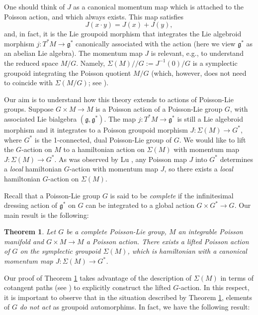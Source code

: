 \documentclass[a4paper,11pt]{amsart}
\newtheorem{thmz}{Theorem}
\theoremstyle{definition}
\theoremstyle{remark}
\begin{document}
One should think of $J$ as a canonical momentum map which is
attached to the Poisson action, and which always exists. This map satisfies
\[ J(x\cdot y)=J(x)+J(y),\]
and, in fact, it is the Lie groupoid morphism that integrates the
Lie algebroid morphism $j:T^*M\to{\mathfrak{g}}^*$ canonically associated
with the action (here we view ${\mathfrak{g}}^*$ as an abelian Lie algebra).
The momentum map $J$ is relevant, e.g., to understand the reduced
space $M/G$. Namely, $\Sigma(M)//G:=J^{-1}(0)/G$ is a symplectic
groupoid integrating the Poisson quotient $M/G$ (which, however,
does not need to coincide with $\Sigma(M/G)$; see \cite{FerOrRa}).

Our aim is to understand how this theory extends to actions of
Poisson-Lie groups. Suppose $G\times M\to M$ is a Poisson action
of a Poisson-Lie group $G$, with associated Lie bialgebra
$({\mathfrak{g}},{\mathfrak{g}}^*)$. The map $j:T^*M\to {\mathfrak{g}}^*$ is still a Lie algebroid
morphism and it integrates to a Poisson groupoid morphism
$J:\Sigma(M)\to G^*$, where $G^*$ is the 1-connected,
dual Poisson-Lie group of $G$.
We would like to lift the $G$-action on $M$ to
a hamiltonian action on $\Sigma(M)$ with momentum map
$J:\Sigma(M)\to G^*$. As was observed by Lu \cite{Lu1}, any
Poisson map $J$ into $G^*$ determines a \emph{local} hamiltonian
$G$-action with momentum map $J$, so there exists a \emph{local}
hamiltonian $G$-action on $\Sigma(M)$.

Recall that a Poisson-Lie group $G$ is said to be {\it complete} if the infinitesimal dressing action of ${\mathfrak{g}}^*$
on $G$ can be integrated to a global action $G\times G^*\to G$. Our main result is the following:

\begin{thmz}
\label{thm:main}
Let $G$ be a complete Poisson-Lie group,
$M$ an integrable Poisson manifold and $G\times M\to M$ a
Poisson action. There exists a lifted Poisson action of $G$
on the symplectic groupoid $\Sigma(M)$, which is hamiltonian with a
canonical momentum map $J:\Sigma(M)\to G^*$.
\end{thmz}

Our proof of Theorem \ref{thm:main} takes advantage of the
description of $\Sigma(M)$ in terms of cotangent paths (see
\cite{CrFe,CrFe2}) to explicitly construct the lifted $G$-action.
In this respect, it is important to observe that in the situation
described by Theorem \ref{thm:main}, elements of $G$ \emph{do not
act} as groupoid automorphims. In fact, we have the following
result:
\end{document}
